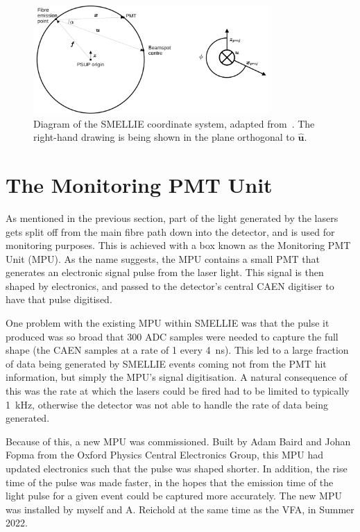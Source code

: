 \begin{figure}
    \centering
    \includegraphics[width=0.8\textwidth]{3_SMELLIEHardware/images/smellie_coordinate_system.pdf}
    \caption[Diagram of the SMELLIE coordinate system]
    {Diagram of the SMELLIE coordinate system, adapted from~\cite{turnerMeasurementScatteringCharacteristics2022}. The right-hand drawing is being shown in the plane orthogonal to $\bm{\hat{u}}$.}
    \label{fig:smellie_coordinate_system}
\end{figure}

\section{The Monitoring PMT Unit}\label{sec:smellie_mpu}
As mentioned in the previous section, part of the light generated by the lasers gets split off from the main fibre path down into the detector, and is used for monitoring purposes. This is achieved with a box known as the Monitoring PMT Unit (MPU). As the name suggests, the MPU contains a small PMT that generates an electronic signal pulse from the laser light. This signal is then shaped by electronics, and passed to the detector's central CAEN digitiser to have that pulse digitised.

One problem with the existing MPU within SMELLIE was that the pulse it produced was so broad that 300 ADC samples were needed to capture the full shape (the CAEN samples at a rate of 1 every \SI{4}{\ns}). This led to a large fraction of data being generated by SMELLIE events coming not from the PMT hit information, but simply the MPU's signal digitisation. A natural consequence of this was the rate at which the lasers could be fired had to be limited to typically \SI{1}{\kHz}, otherwise the detector was not able to handle the rate of data being generated.

Because of this, a new MPU was commissioned. Built by Adam Baird and Johan Fopma from the Oxford Physics Central Electronics Group, this MPU had updated electronics such that the pulse was shaped shorter. In addition, the rise time of the pulse was made faster, in the hopes that the emission time of the light pulse for a given event could be captured more accurately. The new MPU was installed by myself and A. Reichold at the same time as the VFA, in Summer 2022.

